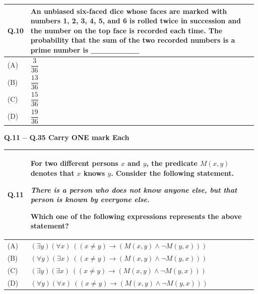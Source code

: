 \documentclass[14pt]{article}
\begin{document}
\newpage

\begin{tabular}{|p{1.5cm}|p{12cm}|}
\hline

\textbf{Q.10} &
An unbiased six-faced dice whose faces are marked with numbers 1, 2, 3, 4, 5, and 6 is rolled twice in succession and the number on the top face is recorded each time. The probability that the sum of the two recorded numbers is a prime number is \_\_\_\_\_\_\_\_
\\

\hline
(A) & 
\rule{0pt}{1cm}
$\dfrac{3}{36}$
\\[0.3cm]

\hline
(B) &
\rule{0pt}{1cm}
$\dfrac{13}{36}$
\\[0.3cm]

\hline
(C) &
\rule{0pt}{1cm}
$\dfrac{15}{36}$
\\[0.3cm]

\hline
(D) &
\rule{0pt}{1cm}
$\dfrac{19}{36}$
\\[0.3cm]

\hline

\end{tabular}

\vspace{0.9cm}

\noindent \textbf{Q.11 -- Q.35 Carry ONE mark Each}

\vspace{0.7cm}

\begin{tabular}{|p{1.2cm}|p{12cm}|}
\hline

\textbf{Q.11} &
For two different persons $x$ and $y$, the predicate $M(x,y)$ denotes that $x$ knows $y$.
Consider the following statement.

\vspace{0.7cm}

\textit{There is a person who does not know anyone else, but that person is known by everyone else.}

\vspace{0.5cm}

Which one of the following expressions represents the above statement?
\\

\hline

(A) & $(\exists y)(\forall x)\ ((x \neq y)\rightarrow(M(x,y)\wedge \neg M(y,x)))$ \\
\hline

(B) & $(\forall y)(\exists x)\ ((x \neq y)\rightarrow(M(x,y)\wedge \neg M(y,x)))$ \\
\hline

(C) & $(\exists y)(\exists x)\ ((x \neq y)\rightarrow(M(x,y)\wedge \neg M(y,x)))$ \\
\hline

(D) & $(\forall y)(\forall x)\ ((x \neq y)\rightarrow(M(x,y)\wedge \neg M(y,x)))$ \\
\hline

\end{tabular}
\end{document}
